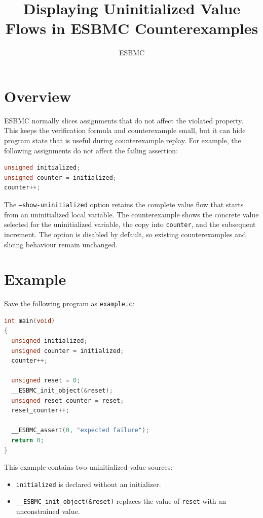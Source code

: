 \documentclass[11pt]{article}
\title{Displaying Uninitialized Value Flows in ESBMC Counterexamples}
\author{ESBMC}
\date{}
\begin{document}
\maketitle

\section{Overview}

ESBMC normally slices assignments that do not affect the violated property.
This keeps the verification formula and counterexample small, but it can hide
program state that is useful during counterexample replay.  For example, the
following assignments do not affect the failing assertion:

\begin{lstlisting}[language=C]
unsigned initialized;
unsigned counter = initialized;
counter++;
\end{lstlisting}

The \texttt{--show-uninitialized} option retains the complete value flow that
starts from an uninitialized local variable.  The counterexample shows the
concrete value selected for the uninitialized variable, the copy into
\texttt{counter}, and the subsequent increment.  The option is disabled by
default, so existing counterexamples and slicing behaviour remain unchanged.

\section{Example}

Save the following program as \texttt{example.c}:

\begin{lstlisting}[language=C]
int main(void)
{
  unsigned initialized;
  unsigned counter = initialized;
  counter++;

  unsigned reset = 0;
  __ESBMC_init_object(&reset);
  unsigned reset_counter = reset;
  reset_counter++;

  __ESBMC_assert(0, "expected failure");
  return 0;
}
\end{lstlisting}

This example contains two uninitialized-value sources:

\begin{itemize}
  \item \texttt{initialized} is declared without an initializer.
  \item \texttt{\_\_ESBMC\_init\_object(\&reset)} replaces the value of
        \texttt{reset} with an unconstrained value.
\end{itemize}
\end{document}
